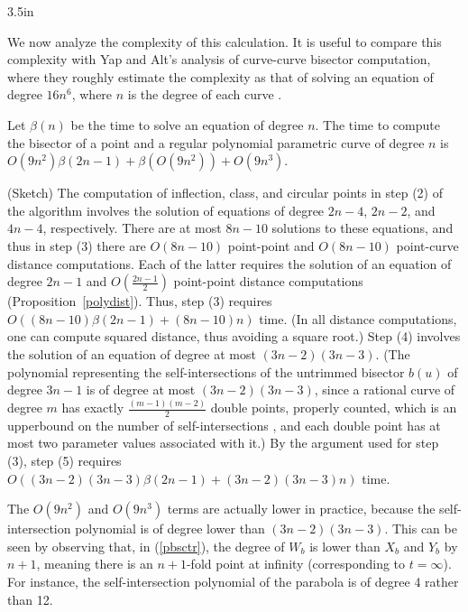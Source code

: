 {3.5in}

We now analyze the complexity of this calculation.
It is useful to compare this complexity with Yap and Alt's analysis of 
curve-curve bisector computation, where they roughly estimate
the complexity as that of solving an equation of degree $16n^6$, 
where $n$ is the degree of each curve \cite{yap89}.

\begin{thm}
Let $\beta(n)$ be the time to solve an equation of degree $n$.
The time to compute the bisector of a point and a regular polynomial
parametric curve of degree $n$ is 
$O(9n^{2}) \beta(2n-1) + \beta(O(9n^2)) + O(9n^3)$.
\end{thm}
\prf (Sketch)
The computation of inflection, class, and circular points in step (2)
of the algorithm
involves the solution of equations of degree $2n-4$, $2n-2$, and $4n-4$,
respectively.
There are at most $8n-10$ solutions to these equations, and thus in step (3)
there are $O(8n-10)$ point-point and $O(8n-10)$ point-curve 
distance computations.
Each of the latter requires the solution of an equation of degree $2n-1$
and $O(\frac{2n-1}{2})$ point-point distance computations
(Proposition~\ref{polydist}).
Thus, step (3) requires $O(\mbox{$(8n-10)\beta(2n-1)$} + \mbox{$(8n-10)n$})$ 
time.
(In all distance computations, one can compute squared distance,
thus avoiding a square root.)
Step (4) involves the solution of an equation of degree at most $(3n-2)(3n-3)$.
(The polynomial representing the self-intersections of the untrimmed
bisector $b(u)$ of degree $3n-1$ is of degree at most $(3n-2)(3n-3)$,
since a rational curve of degree $m$ has exactly $\frac{(m-1)(m-2)}{2}$ 
double points, properly counted, which is an upperbound on the number of
self-intersections \cite{W50}, and 
each double point has at most two parameter values associated with it.)
By the argument used for step (3), step (5) requires
$O(\mbox{$(3n-2)(3n-3)$}\beta(2n-1) + \mbox{$(3n-2)(3n-3)n$})$ time.
\QED

\begin{rmk}
The $O(9n^2)$ and $O(9n^3)$ terms are actually lower in practice, because the
self-intersection polynomial is of degree lower than $(3n-2)(3n-3)$.
This can be seen by observing that, in (\ref{pbsctr}),
the degree of $W_b$ is lower than $X_b$ and $Y_b$ by $n+1$,
meaning there is an $n+1$-fold point at infinity (corresponding to $t=\infty$).
For instance, the self-intersection polynomial of the parabola
is of degree 4 rather than 12.
\end{rmk}

